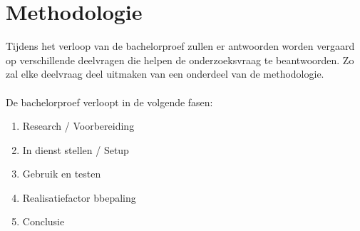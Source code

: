 \section{Methodologie}%
\label{sec:methodologie}

Tijdens het verloop van de bachelorproef zullen er antwoorden worden vergaard op verschillende deelvragen die helpen de onderzoeksvraag te beantwoorden. Zo zal elke deelvraag deel uitmaken van een onderdeel van de methodologie.
\\\\
De bachelorproef verloopt in de volgende fasen:

\begin{enumerate}
  \item Research / Voorbereiding
  \item In dienst stellen / Setup
  \item Gebruik en testen
  \item Realisatiefactor bbepaling
  \item Conclusie
\end{enumerate}

